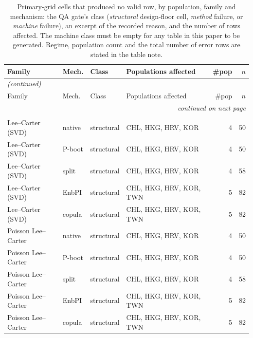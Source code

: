 {\footnotesize\setlength{\tabcolsep}{2.5pt}
\begin{longtable}{@{}llp{1.5cm}p{5.6cm}rr@{}}
\caption{Primary-grid cells that produced no valid row, by population, family and mechanism: the QA gate's class (\emph{structural} design-floor cell, \emph{method} failure, or \emph{machine} failure), an excerpt of the recorded reason, and the number of rows affected. The machine class must be empty for any table in this paper to be generated. Regime, population count and the total number of error rows are stated in the table note.}\label{tab:infeasible} \\
\toprule
Family & Mech. & Class & Populations affected & \#pop & $n$ \\
\midrule
\endfirsthead
\multicolumn{6}{l}{\emph{(continued)}} \\
\toprule
Family & Mech. & Class & Populations affected & \#pop & $n$ \\
\midrule
\endhead
\midrule \multicolumn{6}{r}{\emph{continued on next page}} \\
\endfoot
\bottomrule
\endlastfoot
\multicolumn{6}{l}{\textbf{stable regime}} \\
\midrule
Lee--Carter (SVD) & native & structural & CHL, HKG, HRV, KOR & 4 & 50 \\
Lee--Carter (SVD) & P-boot & structural & CHL, HKG, HRV, KOR & 4 & 50 \\
Lee--Carter (SVD) & split & structural & CHL, HKG, HRV, KOR & 4 & 58 \\
Lee--Carter (SVD) & EnbPI & structural & CHL, HKG, HRV, KOR, TWN & 5 & 82 \\
Lee--Carter (SVD) & copula & structural & CHL, HKG, HRV, KOR, TWN & 5 & 82 \\
Poisson Lee--Carter & native & structural & CHL, HKG, HRV, KOR & 4 & 50 \\
Poisson Lee--Carter & P-boot & structural & CHL, HKG, HRV, KOR & 4 & 50 \\
Poisson Lee--Carter & split & structural & CHL, HKG, HRV, KOR & 4 & 58 \\
Poisson Lee--Carter & EnbPI & structural & CHL, HKG, HRV, KOR, TWN & 5 & 82 \\
Poisson Lee--Carter & copula & structural & CHL, HKG, HRV, KOR, TWN & 5 & 82 \\

\end{longtable}}
